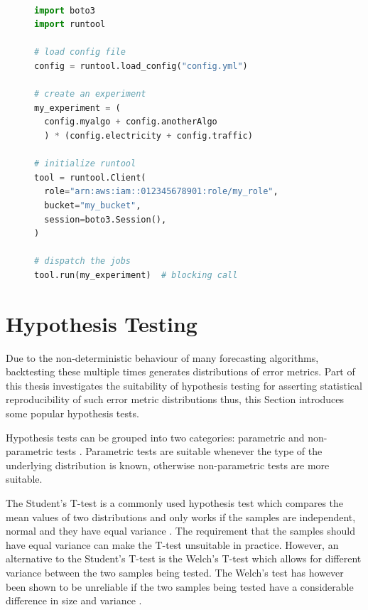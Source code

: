 \begin{figure}[h]
  \begin{lstlisting}[language=Python, label={fig:example_script}, caption={Python script using the config from Figure \ref{fig:example_config} to create four experiments}]

import boto3
import runtool

# load config file
config = runtool.load_config("config.yml")

# create an experiment
my_experiment = (
  config.myalgo + config.anotherAlgo
  ) * (config.electricity + config.traffic)

# initialize runtool
tool = runtool.Client(
  role="arn:aws:iam::012345678901:role/my_role",
  bucket="my_bucket",
  session=boto3.Session(),
)

# dispatch the jobs
tool.run(my_experiment)  # blocking call

  \end{lstlisting}

\end{figure}
\clearpage



\section{Hypothesis Testing}
\label{sec:hypothesis_tests}
Due to the non-deterministic behaviour of many forecasting algorithms, backtesting these multiple times generates distributions of error metrics. Part of this thesis investigates the suitability of hypothesis testing for asserting statistical reproducibility of such error metric distributions thus, this Section introduces some popular hypothesis tests.

Hypothesis tests can be grouped into two categories: parametric and non-parametric tests \cite{kim2015t}. Parametric tests are suitable whenever the type of the underlying distribution is known, otherwise non-parametric tests are more suitable.

The Student's T-test is a commonly used hypothesis test which compares the mean values of two distributions and only works if the samples are independent, normal and they have equal variance \cite{kim2015t}. The requirement that the samples should have equal variance can make the T-test unsuitable in practice. However, an alternative to the Student's T-test is the Welch’s T-test which allows for different variance between the two samples being tested. The Welch’s test has however been shown to be unreliable if the two samples being tested have a considerable difference in size and variance \cite{student_or_welch}.

